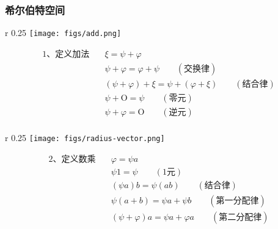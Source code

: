 \begin{frame} 
    \frametitle{希尔伯特空间}
    \begin{wrapfigure} {r} {0.25\textwidth} %
        \texttt{[image: figs/add.png]}   
    \end{wrapfigure}
    \begin{equation*}
        \begin{split}
            \text{1、定义加法} \quad  &\xi=\psi+\varphi\\
            &\psi+\varphi=\varphi+\psi \qquad (\text{交换律})\\
            &(\psi+\varphi)+\xi=\psi+(\varphi+\xi) \qquad (\text{结合律})\\
            &\psi+\text{O}= \psi \qquad (\text{零元})\\
            &\psi+\varphi= \text{O} \qquad (\text{逆元})\\
        \end{split}  
    \end{equation*}
\end{frame} 

\begin{frame} 
    \begin{wrapfigure} {r} {0.25\textwidth} %
            \texttt{[image: figs/radius-vector.png]}   
        \end{wrapfigure}
    \begin{equation*}
        \begin{split}
            \text{2、定义数乘} \quad &\varphi=\psi a\\
            &\psi 1= \psi \qquad (\text{1元})\\
            &(\psi a)b=\psi (ab) \qquad (\text{结合律})\\
            &\psi(a+b)= \psi a+ \psi b \qquad (\text{第一分配律})\\
            &(\psi+\varphi) a= \psi a +\varphi a \qquad (\text{第二分配律})\\
        \end{split}  
    \end{equation*}
\end{frame} 

